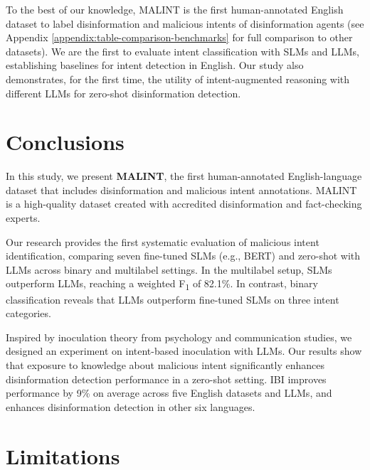 \documentclass[11pt]{article}
\newcommand{\infotext}[1]{\textcolor{red!70!black}{\textbf{#1}}}
\begin{document}
To the best of our knowledge, MALINT is the first human-annotated English dataset to label disinformation and malicious intents of disinformation agents (see Appendix \ref{appendix:table-comparison-benchmarks} for full comparison to other datasets). We are the first to evaluate intent classification with SLMs and LLMs, establishing baselines for intent detection in English. Our study also demonstrates, for the first time, the utility of intent-augmented reasoning with different LLMs for zero-shot disinformation detection.



\section{Conclusions}


In this study, we present \textbf{MALINT}, the first human-annotated English-language dataset that includes disinformation and malicious intent annotations. MALINT is a high-quality dataset created with accredited disinformation and fact-checking experts.

Our research provides the first systematic evaluation of malicious intent identification, comparing seven fine-tuned SLMs (e.g., BERT) and zero-shot with LLMs across binary and multilabel settings. In the multilabel setup, SLMs outperform LLMs, reaching a weighted F\textsubscript{1} of 82.1\%. In contrast, binary classification reveals that LLMs outperform fine-tuned SLMs on three intent categories.


Inspired by inoculation theory from psychology and communication studies, we designed an experiment on intent-based inoculation with LLMs. Our results show that exposure to knowledge about malicious intent significantly enhances disinformation detection performance in a zero-shot setting. IBI improves performance by 9\% on average across five English datasets and LLMs, and enhances disinformation detection in other six languages.



\section*{Limitations}
\end{document}
